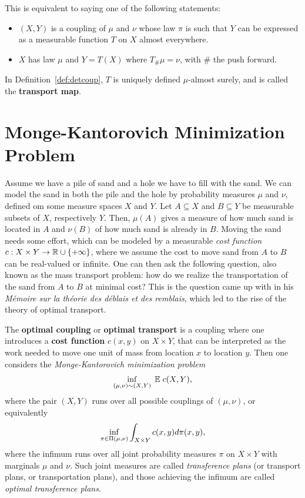 This is equivalent to saying one of the following statements: 
\begin{itemize}
	\item $(X,Y)$ is a coupling of $\mu$ and $\nu$ whose law $\pi$ is such that $Y$ can be expressed as a measurable function $T$ on $X$ almost everywhere. 
	\item $X$ has law $\mu$ and $Y = T(X)$ where $T_\#\mu = \nu$, with $\#$ the push forward.
\end{itemize}
In Definition~\ref{def:detcoup}, $T$ is uniquely defined $\mu$-almost surely, and is called the \textbf{transport map}.


\section{Monge-Kantorovich Minimization Problem}
Assume we have a pile of sand and a hole we have to fill with the sand. We can model the sand in both the pile and the hole by probability measures $\mu$ and $\nu$, defined om some measure spaces $X$ and $Y$. Let $A\subseteq X$ and $B\subseteq Y$ be measurable subsets of $X$, respectively $Y$. Then, $\mu(A)$ gives a measure of how much sand is located in $A$ and $\nu(B)$ of how much sand is already in $B$. Moving the sand needs some effort, which can be modeled by a measurable \textit{cost function} $c: X \times Y \rightarrow \mathbb{R} \cup \{+ \infty\}$, where we assume the cost to move sand from $A$ to $B$ can be real-valued or infinite. One can then ask the following question, also known as the mass transport problem: how do we realize the transportation of the sand from $A$ to $B$ at minimal cost? This is the question \citet{monge1781} came up with in his \textit{M\'emoire sur la th\'eorie des d\'eblais et des remblais}, which led to the rise of the theory of optimal transport. \par
\vspace{0.3cm}
\begin{example}
	The \textbf{optimal coupling} or \textbf{optimal transport} is a coupling where one introduces a \textbf{cost function} $c(x,y)$ on $X \times Y$, that can be interpreted as the work needed to move one unit of mass from location $x$ to location $y$. Then one considers the \textit{Monge-Kantorovich minimization problem}
	\[\operatorname*{inf}_{(\mu, \nu) \sim (X,Y)}\; \mathbb{E} \; c(X,Y), \]
	where the pair $(X,Y)$ runs over all possible couplings of $(\mu, \nu)$, or equivalently
	\begin{equation}
		\operatorname*{inf}_{\pi \in \Pi(\mu, \nu)} \int_{X \times Y} c(x,y) d\pi(x,y),
		\label{eq:otdef}
	\end{equation}
	where the infimum runs over all joint probability measures $\pi$ on $X \times Y$ with marginals $\mu$ and $\nu$. Such joint measures are called \textit{transference plans} (or transport plans, or transportation plans), and those achieving the infimum are called \textit{optimal transference plans}. 
	\label{ex:ot}
\end{example}
